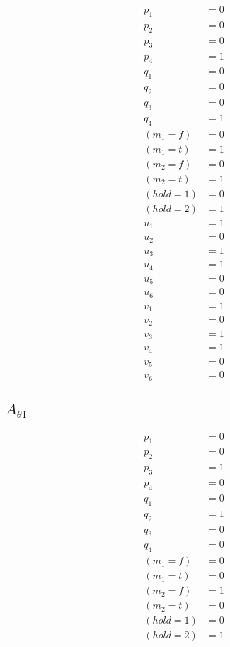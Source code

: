 \documentclass{scrartcl}
\begin{document}
\begin{align*}
  p_1 &= 0 \\
  p_2 &= 0 \\
  p_3 &= 0 \\
  p_4 &= 1 \\
  q_1 &= 0 \\
  q_2 &= 0 \\
  q_3 &= 0 \\
  q_4 &= 1 \\
  (m_1=f) &= 0 \\
  (m_1=t) &= 1 \\
  (m_2=f) &= 0 \\
  (m_2=t) &= 1 \\
  (hold=1) &= 0 \\
  (hold=2) &= 1 \\
  u_1 &= 1 \\
  u_2 &= 0 \\
  u_3 &= 1 \\
  u_4 &= 1 \\
  u_5 &= 0 \\
  u_6 &= 0 \\
  v_1 &= 1 \\
  v_2 &= 0 \\
  v_3 &= 1 \\
  v_4 &= 1 \\
  v_5 &= 0 \\
  v_6 &= 0
\end{align*}

\subsection{$A_{\theta 1}$}
\begin{align*}
  p_1 &= 0 \\
  p_2 &= 0 \\
  p_3 &= 1 \\
  p_4 &= 0 \\
  q_1 &= 0 \\
  q_2 &= 1 \\
  q_3 &= 0 \\
  q_4 &= 0 \\
  (m_1=f) &= 0 \\
  (m_1=t) &= 0 \\
  (m_2=f) &= 1 \\
  (m_2=t) &= 0 \\
  (hold=1) &= 0 \\
  (hold=2) &= 1
\end{align*}
\end{document}
